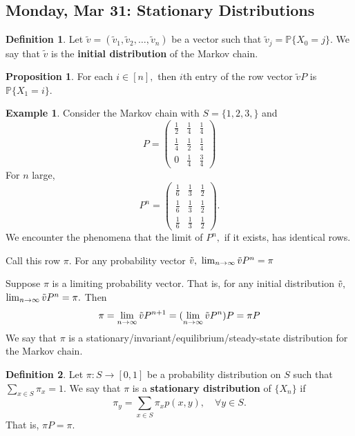 \documentclass[10pt, oneside]{article}
\newcommand{\bbP}{\mathbb{P}}
\theoremstyle{definition}
\newtheorem{exmp}{Example}[section]
\newtheorem{defn}{Definition}
\newtheorem{prop}{Proposition}
\begin{document}
\subsection{Monday, Mar 31: Stationary Distributions}
\begin{defn}
    Let $\tilde{v} = (\tilde{v}_1, \tilde{v}_2, \dots, \tilde{v}_n)$ be a vector such that $\tilde{v}_j = \bbP\{X_0 = j\}.$ We say that $\tilde{v}$ is the \textbf{initial distribution} of the Markov chain.
\end{defn}
\begin{prop}
    For each $i \in [n],$ then $i$th entry of the row vector $\tilde{v} P$ is $\bbP\{X_1 = i\}.$
\end{prop}
\begin{exmp}
    Consider the Markov chain with $S = \{1,2,3,\}$ and 
    \[P = \begin{pmatrix}
        \frac{1}{2} & \frac{1}{4} & \frac{1}{4}\\
        \frac{1}{4} & \frac{1}{2} & \frac{1}{4}\\
        0 & \frac{1}{4} & \frac{3}{4}
    \end{pmatrix}\]
    For $n$ large, 
        \[P^n = \begin{pmatrix}
        \frac{1}{6} & \frac{1}{3} & \frac{1}{2}\\
        \frac{1}{6} & \frac{1}{3} & \frac{1}{2}\\
        \frac{1}{6} & \frac{1}{3} & \frac{1}{2}
    \end{pmatrix}.\] We encounter the phenomena that the limit of $P^n,$ if it exists, has identical rows. 

    Call this row $\pi.$ For any probability vector $\Tilde{v},$ $\lim_{n\to \infty} \Tilde{v} P^n = \pi$
\end{exmp}

Suppose $\pi$ is a limiting probability vector. That is, for any initial distribution $\Tilde{v},$ $\lim_{n\to \infty}\Tilde{v}P^n = \pi.$ Then 
\[\pi = \lim_{n\to \infty}\Tilde{v}P^{n + 1} = (\lim_{n\to \infty}\Tilde{v}P^n)P = \pi P\] We say that $\pi$ is a {stationary/invariant/equilibrium/steady-state} distribution for the Markov chain. 

\begin{defn}
    Let $\pi: S \to [0,1]$ be a probability distribution on $S$ such that $\sum_{x\in S} \pi_x = 1.$ We say that $\pi$ is a \textbf{stationary distribution} of $\{X_n\}$ if 
    \[\pi_y = \sum_{x\in S}\pi_x p(x,y), \quad \forall y \in S.\] That is, $\pi P =  \pi.$
\end{defn}
\end{document}
